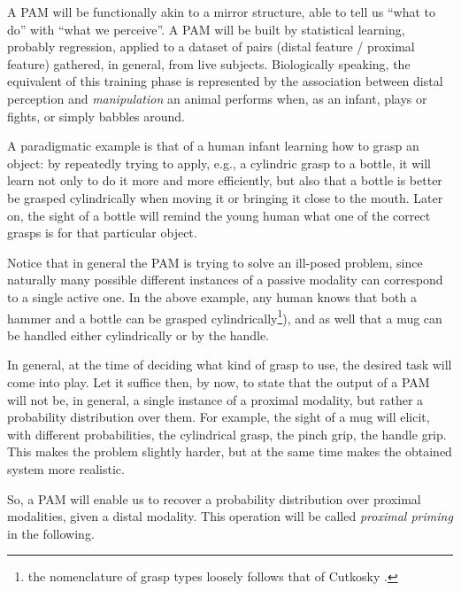 A PAM will be functionally akin to a mirror structure, able to tell us ``what
to do'' with ``what we perceive''. A PAM will be built by statistical learning,
probably regression, applied to a dataset of pairs (distal feature / proximal
feature) gathered, in general, from live subjects. Biologically speaking,
the equivalent of this training phase is represented by the association between
distal perception and \emph{manipulation} an animal performs when, as an infant,
plays or fights, or simply babbles around.

A paradigmatic example is that of a human infant learning how to grasp an object:
by repeatedly trying to apply, e.g., a cylindric grasp to a bottle, it will learn
not only to do it more and more efficiently, but also that a bottle is better be
grasped cylindrically when moving it or bringing it close to the mouth. Later on,
the sight of a bottle will remind the young human what one of the correct grasps
is for that particular object.

Notice that in general the PAM is trying to solve an ill-posed problem, since
naturally many possible different instances of a passive modality can correspond
to a single active one. In the above example, any human knows that both a hammer
and a bottle can be grasped cylindrically\footnote{the nomenclature of grasp types
loosely follows that of Cutkosky \cite{cutkosky}.}), and as well that a mug can be
handled either cylindrically or by the handle.

In general, at the time of deciding
what kind of grasp to use, the desired task will come into play. Let it suffice
then, by now, to state that the output of a PAM will not be, in general, a single
instance of a proximal modality, but rather a probability distribution over them.
For example, the sight of a mug will elicit, with different probabilities, the
cylindrical grasp, the pinch grip, the handle grip. This makes the problem slightly
harder, but at the same time makes the obtained system more realistic.

So, a PAM will enable us to recover a probability distribution over proximal
modalities, given a distal modality. This operation will be called \emph{proximal
priming} in the following.






